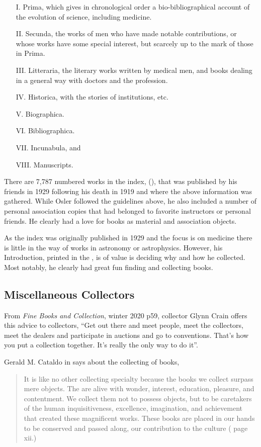 \documentclass[letterpaper]{article}
\begin{document}
\begin{itemize}
\item[I.] Prima, which gives in chronological order a
  bio-bibliographical account of the evolution of science, including
  medicine.
\item[II.] Secunda, the works of men who have made notable
  contributions, or whose works have some special interest, but
  scarcely up to the mark of those in Prima.
\item[III.] Litteraria, the literary works written by medical men, and
  books dealing in a general way with doctors and the profession.
\item[IV.] Historica, with the stories of institutions, etc.
\item[V.] Biographica.
\item[VI.] Bibliographica.
\item[VII.] Incunabula, and
\item[VIII.] Manuscripts.
\end{itemize}

There are 7,787 numbered works in the index,  (\cite{Francis2000}), that was published by his friends
in 1929 following his death in 1919 and where the above information
was gathered.  While Osler followed the guidelines above, he also
included a number of personal association copies that had belonged to
favorite instructors or personal friends. He clearly had a love for
books as material and association objects.

As the index was originally published in 1929 and the focus is on
medicine there is little in the way of  works in astronomy or
astrophysics.  However, his Introduction, printed in the
, is of value is deciding why and how he
collected. Most notably, he clearly had great fun finding and
collecting books.


\subsection{Miscellaneous Collectors}

From {\itshape Fine Books and Collection}, winter 2020 p59, collector
Glynn Crain offers this advice to collectors, ``Get out there and meet
people, meet the collectors, meet the dealers and participate in
auctions and go to conventions. That's how you put a collection
together. It's really the only way to do it''.

Gerald M. Cataldo in  says about the
collecting of books,
\begin{quotation}
  It is like no other collecting specialty because the books we collect
  surpass mere objects. The are alive with wonder, interest, education,
  pleasure, and contentment. We collect them not to possess objects, but
  to be caretakers of the human inquisitiveness, excellence, imagination,
  and achievement that created these magnificent works. These books are
  placed in our hands to be conserved and passed along, our contribution
  to the culture (\cite{Cataldo2010} page xii.)
\end{quotation}
\end{document}
